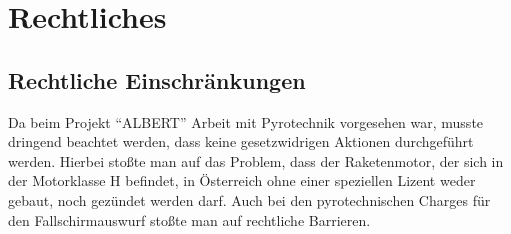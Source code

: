 \fancyfoot[C]{}
\part{Rechtliches}
\label{part:legal}

\chapter{Rechtliche Einschränkungen}
\label{ch:legal_boundaries}

Da beim Projekt "`ALBERT"' Arbeit mit Pyrotechnik vorgesehen war, musste dringend beachtet werden, dass keine gesetzwidrigen Aktionen durchgeführt werden. Hierbei stoßte man auf das Problem, dass der Raketenmotor, der sich in der Motorklasse H befindet, in Österreich ohne einer speziellen Lizent weder gebaut, noch gezündet werden darf. Auch bei den pyrotechnischen Charges für den Fallschirmauswurf stoßte man auf rechtliche Barrieren.

